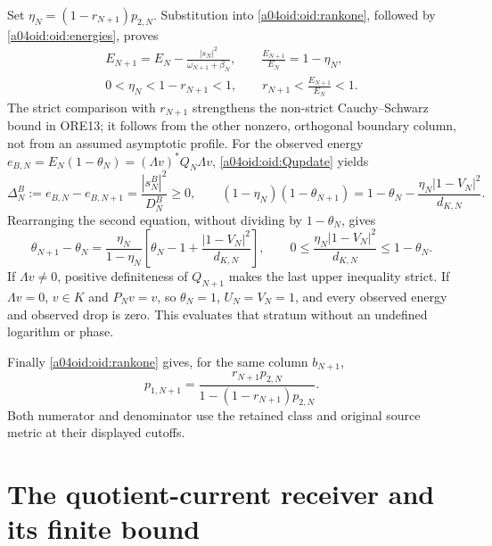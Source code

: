 \documentclass[11pt,a4paper]{article}
\begin{document}
Set $\eta_N=(1-r_{N+1})p_{2,N}$. Substitution into
\eqref{a04oid:oid:rankone}, followed by \eqref{a04oid:oid:energies}, proves
\begin{equation}\label{a04oid:oid:Eloss}
\begin{gathered}
 E_{N+1}=E_N-\frac{|s_N|^2}{\omega_{N+1}+\beta_N},\qquad
 \frac{E_{N+1}}{E_N}=1-\eta_N,\\
 0<\eta_N<1-r_{N+1}<1,
 \qquad r_{N+1}<\frac{E_{N+1}}{E_N}<1.
\end{gathered}
\end{equation}
The strict comparison with $r_{N+1}$ strengthens the non-strict
Cauchy--Schwarz bound in ORE13; it follows from the other nonzero,
orthogonal boundary column, not from an assumed asymptotic profile.
For the observed energy
$e_{B,N}=E_N(1-\theta_N)=(\Lambda v)^*Q_N\Lambda v$,
\eqref{a04oid:oid:Qupdate} yields
\begin{equation}\label{a04oid:oid:observedloss}
 \Delta_N^B:=e_{B,N}-e_{B,N+1}
 =\frac{|s_N^B|^2}{D_N^B}\ge0,
 \qquad
 (1-\eta_N)(1-\theta_{N+1})
 =1-\theta_N-\frac{\eta_N|1-V_N|^2}{d_{K,N}}.
\end{equation}
Rearranging the second equation, without dividing by $1-\theta_N$,
gives
\begin{equation}\label{a04oid:oid:theta}
 \theta_{N+1}-\theta_N
 =\frac{\eta_N}{1-\eta_N}
 \left[\theta_N-1+\frac{|1-V_N|^2}{d_{K,N}}\right],\qquad
 0\le\frac{\eta_N|1-V_N|^2}{d_{K,N}}\le1-\theta_N.
\end{equation}
If $\Lambda v\ne0$, positive definiteness of $Q_{N+1}$ makes the
last upper inequality strict. If $\Lambda v=0$, $v\in K$ and
$P_Nv=v$, so $\theta_N=1$, $U_N=V_N=1$, and every observed
energy and observed drop is zero. This evaluates that stratum without
an undefined logarithm or phase.

Finally \eqref{a04oid:oid:rankone} gives, for the same column $b_{N+1}$,
\begin{equation}\label{a04oid:oid:p1transport}
 p_{1,N+1}=
 \frac{r_{N+1}p_{2,N}}
 {1-(1-r_{N+1})p_{2,N}}.
\end{equation}
Both numerator and denominator use the retained class and original
source metric at their displayed cutoffs.

\section{The quotient-current receiver and its finite bound}
\end{document}
